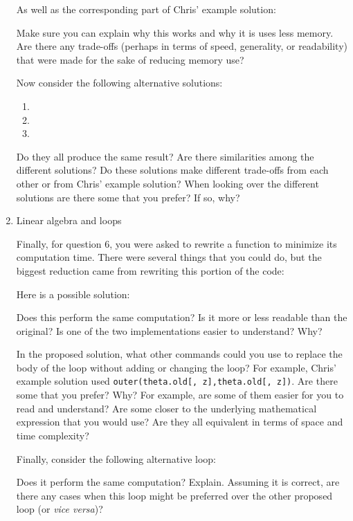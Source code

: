 \documentclass{article}
\begin{document}
\begin{enumerate}

As well as the corresponding part of Chris' example solution:


Make sure you can explain why this works and why it is uses less memory.
Are there any trade-offs (perhaps in terms of speed, generality, or readability)
that were made for the sake of reducing memory use?

Now consider the following alternative solutions:

\begin{enumerate}

\item


\item


\item


\end{enumerate}

Do they all produce the same result?
Are there similarities among the different solutions?
Do these solutions make different trade-offs from each other or from
Chris' example solution?
When looking over the different solutions are there some that you prefer?
If so, why?

\item Linear algebra and loops

Finally, for question 6, you were asked to rewrite a function to minimize
its computation time.  There were several things that you could do, but the
biggest reduction came from rewriting this portion of the code:


Here is a possible solution:


Does this perform the same computation?  Is it more or less readable than
the original?  Is one of the two implementations easier to understand?  Why?

In the proposed solution, what other commands could you use to replace the
body of the loop without adding or changing the loop?  For example, Chris'
example solution used \texttt{outer(theta.old[, z],theta.old[, z])}.  Are
there some that you prefer?  Why?  For example, are some of them easier for
you to read and understand?  Are some closer to the underlying mathematical
expression that you would use?  Are they all equivalent in terms of space
and time complexity?  

Finally, consider the following alternative loop:


Does it perform the same computation?  Explain.
Assuming it is correct, are there any cases when this loop might be
preferred over the other proposed loop (or \emph{vice versa})?


\end{enumerate}
\end{document}
